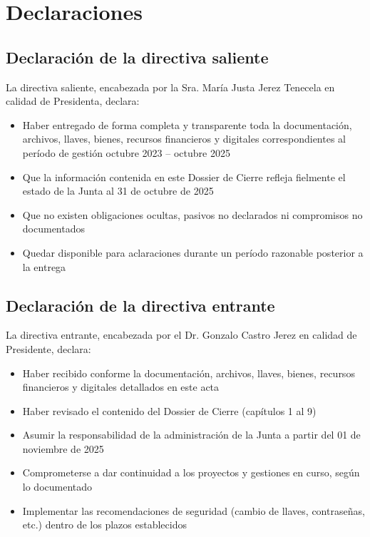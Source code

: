 \section*{Declaraciones}

\subsection*{Declaración de la directiva saliente}

La directiva saliente, encabezada por la Sra. María Justa Jerez Tenecela en calidad de Presidenta, declara:

\begin{itemize}
  \item Haber entregado de forma completa y transparente toda la documentación, archivos, llaves, bienes, recursos financieros y digitales correspondientes al período de gestión octubre 2023 -- octubre 2025
  \item Que la información contenida en este Dossier de Cierre refleja fielmente el estado de la Junta al 31 de octubre de 2025
  \item Que no existen obligaciones ocultas, pasivos no declarados ni compromisos no documentados
  \item Quedar disponible para aclaraciones durante un período razonable posterior a la entrega
\end{itemize}

\subsection*{Declaración de la directiva entrante}

La directiva entrante, encabezada por el Dr. Gonzalo Castro Jerez en calidad de Presidente, declara:

\begin{itemize}
  \item Haber recibido conforme la documentación, archivos, llaves, bienes, recursos financieros y digitales detallados en este acta
  \item Haber revisado el contenido del Dossier de Cierre (capítulos 1 al 9)
  \item Asumir la responsabilidad de la administración de la Junta a partir del 01 de noviembre de 2025
  \item Comprometerse a dar continuidad a los proyectos y gestiones en curso, según lo documentado
  \item Implementar las recomendaciones de seguridad (cambio de llaves, contraseñas, etc.) dentro de los plazos establecidos
\end{itemize}

